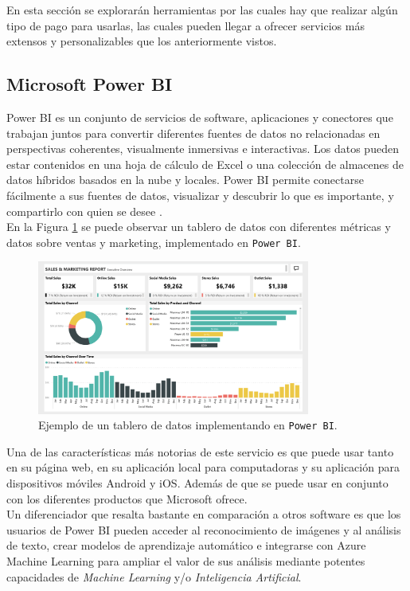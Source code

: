 En esta sección se explorarán herramientas por las cuales hay que realizar algún tipo de pago para usarlas, las cuales pueden llegar a ofrecer servicios más extensos y personalizables que los anteriormente vistos.


\subsection{Microsoft Power BI}
Power BI es un conjunto de servicios de software, aplicaciones y conectores que trabajan juntos para convertir diferentes fuentes de datos no relacionadas en perspectivas coherentes, visualmente inmersivas e interactivas. Los datos pueden estar contenidos en una hoja de cálculo de Excel o una colección de almacenes de datos híbridos basados en la nube y locales. Power BI  permite conectarse fácilmente a sus fuentes de datos, visualizar y descubrir lo que es importante, y compartirlo con quien se desee \cite{microsoft_power_bi_overview} \cite{clark2017beginning}.\\

En la Figura \ref{fig:powerBI_ej} se puede observar un tablero de datos con diferentes métricas y datos sobre ventas y marketing, implementado en \texttt{Power BI}.

    \begin{figure}[H]
        \centering
        \includegraphics[width=0.8\textwidth]{images/power_bi_ejemplo.png}
        \caption{Ejemplo de un tablero de datos implementando en \texttt{Power BI}.}\label{fig:powerBI_ej}
    \end{figure}

Una de las características más notorias de este servicio es que puede usar tanto en su página web, en su aplicación local para computadoras y su aplicación para dispositivos móviles Android y iOS. Además de que se puede usar en conjunto con los diferentes productos que Microsoft ofrece.\\
Un diferenciador que resalta bastante en comparación a otros software es que los usuarios de Power BI  pueden acceder al reconocimiento de imágenes y al análisis de texto, crear modelos de aprendizaje automático e integrarse con Azure Machine Learning para ampliar el valor de sus análisis mediante potentes capacidades de \textit{Machine Learning} y/o \textit{Inteligencia Artificial}.\\

